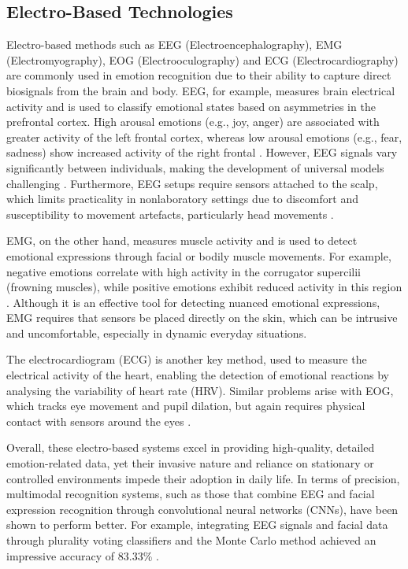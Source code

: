 \subsection{Electro-Based Technologies}
Electro-based methods such as EEG (Electroencephalography), EMG (Electromyography), EOG (Electrooculography) and ECG (Electrocardiography) are commonly used in emotion recognition due to their ability to capture direct biosignals from the brain and body. EEG, for example, measures brain electrical activity and is used to classify emotional states based on asymmetries in the prefrontal cortex. High arousal emotions (e.g., joy, anger) are associated with greater activity of the left frontal cortex, whereas low arousal emotions (e.g., fear, sadness) show increased activity of the right frontal \cite{Suhaila2021-dh}. However, EEG signals vary significantly between individuals, making the development of universal models challenging \cite{Pal2021-eq}. Furthermore, EEG setups require sensors attached to the scalp, which limits practicality in nonlaboratory settings due to discomfort and susceptibility to movement artefacts, particularly head movements \cite{Tan2021-ai}. 

EMG, on the other hand, measures muscle activity and is used to detect emotional expressions through facial or bodily muscle movements. For example, negative emotions correlate with high activity in the corrugator supercilii (frowning muscles), while positive emotions exhibit reduced activity in this region \cite{Suhaila2021-dh}. Although it is an effective tool for detecting nuanced emotional expressions, EMG requires that sensors be placed directly on the skin, which can be intrusive and uncomfortable, especially in dynamic everyday situations.

The electrocardiogram (ECG) is another key method, used to measure the electrical activity of the heart, enabling the detection of emotional reactions by analysing the variability of heart rate (HRV). Similar problems arise with EOG, which tracks eye movement and pupil dilation, but again requires physical contact with sensors around the eyes \cite{Dzedzickis2020-hf}.

Overall, these electro-based systems excel in providing high-quality, detailed emotion-related data, yet their invasive nature and reliance on stationary or controlled environments impede their adoption in daily life. In terms of precision, multimodal recognition systems, such as those that combine EEG and facial expression recognition through convolutional neural networks (CNNs), have been shown to perform better. For example, integrating EEG signals and facial data through plurality voting classifiers and the Monte Carlo method achieved an impressive accuracy of 83.33\% \cite{Tan2021-ai}.

